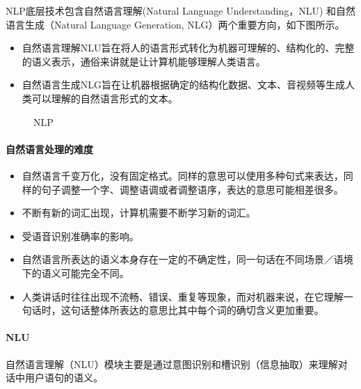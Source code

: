 \documentclass[letterpaper,10pt,english]{sphinxmanual}
\begin{document}
NLP底层技术包含自然语言理解(Natural Language Understanding，NLU)
和自然语言生成（Natural Language Generation,
NLG）两个重要方向，如下图所示。
\begin{itemize}
\item {} 
自然语言理解NLU旨在将人的语言形式转化为机器可理解的、结构化的、完整的语义表示，通俗来讲就是让计算机能够理解人类语言。

\item {} 
自然语言生成NLG旨在让机器根据确定的结构化数据、文本、音视频等生成人类可以理解的自然语言形式的文本。

\end{itemize}

\begin{figure}[H]
\centering
\capstart

\noindent{}
\caption{NLP}\label{\detokenize{chapter_AI_dive/NLP:id22}}\end{figure}


\paragraph{自然语言处理的难度}
\label{\detokenize{chapter_AI_dive/NLP:id4}}\begin{itemize}
\item {} 
自然语言千变万化，没有固定格式。同样的意思可以使用多种句式来表达，同样的句子调整一个字、调整语调或者调整语序，表达的意思可能相差很多。

\item {} 
不断有新的词汇出现，计算机需要不断学习新的词汇。

\item {} 
受语音识别准确率的影响。

\item {} 
自然语言所表达的语义本身存在一定的不确定性，同一句话在不同场景／语境下的语义可能完全不同。

\item {} 
人类讲话时往往出现不流畅、错误、重复等现象，而对机器来说，在它理解一句话时，这句话整体所表达的意思比其中每个词的确切含义更加重要。

\end{itemize}


\paragraph{NLU}
\label{\detokenize{chapter_AI_dive/NLP:nlu}}
自然语言理解（NLU）模块主要是通过意图识别和槽识别（信息抽取）来理解对话中用户语句的语义。
\end{document}
